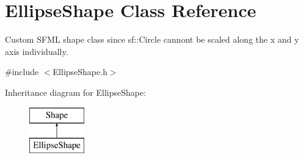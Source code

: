 \hypertarget{class_ellipse_shape}{}\section{Ellipse\+Shape Class Reference}
\label{class_ellipse_shape}


Custom S\+F\+ML shape class since sf\+::\+Circle cannont be scaled along the x and y axis individually.  




{\ttfamily \#include $<$Ellipse\+Shape.\+h$>$}

Inheritance diagram for Ellipse\+Shape\+:\begin{figure}[H]
\begin{center}
\leavevmode
\includegraphics[height=2.000000cm]{class_ellipse_shape}
\end{center}
\end{figure}
